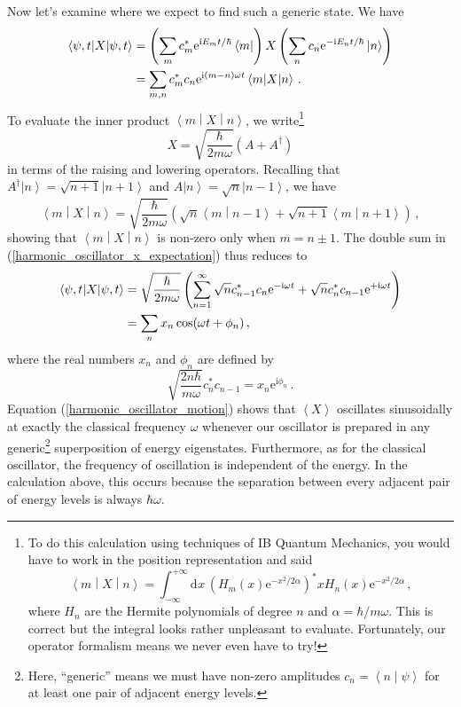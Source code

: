 \documentclass{article}
\theoremstyle{plain}\theoremheaderfont{\normalfont\itshape}\theorembodyfont{\rmfamily}\theoremseparator{.}\newtheorem*{rem}{Remark}\newtheorem*{ex}{Example}\newtheorem*{proof}{Proof}\newtheorem*{altp}{Alternative proof}
\theoremstyle{plain}\theoremheaderfont{\normalfont\bfseries}\theorembodyfont{\rmfamily}\theoremseparator{.}\newtheorem{thm}{Theorem}[section]\newtheorem{lem}[thm]{Lemma}\newtheorem{prop}[thm]{Proposition}\newtheorem*{cor}{Corollary}\newtheorem{defn}[thm]{Definition}\newtheorem{clm}[thm]{Claim}\newtheorem{clminproof}{Claim}
\theoremstyle{break}\theoremheaderfont{\normalfont\itshape}\theorembodyfont{\rmfamily}\theoremseparator{.\medskip}\newtheorem*{proofskip}{Proof}\newtheorem*{exs}{Examples}\newtheorem*{rems}{Remarks}
\theoremstyle{break}\theoremheaderfont{\normalfont\bfseries}\theorembodyfont{\rmfamily}\theoremseparator{.\medskip}\newtheorem{lemskip}[thm]{Lemma}\newtheorem{defnskip}[thm]{Definition}\newtheorem{propskip}[thm]{Proposition}\newtheorem{thmskip}[thm]{Theorem}
\numberwithin{equation}{section}
\newcommand{\ii}{\mathrm{i}}
\newcommand{\ee}{\mathrm{e}}
\newcommand{\dd}[2][]{\mathrm{d}^{#1} #2\,}
\newcommand{\bra}[1]{\left\langle #1 \right|}
\newcommand{\ket}[1]{\left| #1 \right\rangle}
\newcommand{\braket}[2]{\left\langle #1 \middle| #2 \right\rangle}
\newcommand{\mel}[3]{\left\langle #1 \middle| #2 \middle| #3 \right\rangle}
\newcommand{\eval}[1]{\left\langle #1 \right\rangle}
\newcommand{\expval}[2]{\left\langle #2 \middle| #1 \middle| #2 \right\rangle}
\begin{document}
    Now let's examine where we expect to find such a generic state. We have
    \begin{align}
        \expval{X}{\psi,t}&=\left(\sum_m c_m^* \ee^{\ii E_mt/\hbar}\bra{m}\right)X\left(\sum_n c_n \ee^{-\ii E_nt/\hbar}\ket{n}\right) \notag\\
        &=\sum_{m,n}c_m^* c_n \ee^{\ii (m-n)\omega t}\mel{m}{X}{n}\,.\label{harmonic_oscillator_x_expectation}
    \end{align}
    To evaluate the inner product \(\mel{m}{X}{n}\), we write\footnote{To do this calculation using techniques of IB Quantum Mechanics, you would have to work in the position representation and said
    \begin{equation}
        \mel{m}{X}{n}=\int_{-\infty}^{+\infty}\dd{x}\left(H_m(x)\ee^{-x^2/2\alpha}\right)^*xH_n(x)\ee^{-x^2/2\alpha}\,,
    \end{equation}
    where \(H_n\) are the Hermite polynomials of degree \(n\) and \(\alpha=\hbar/m\omega\). This is correct but the integral looks rather unpleasant to evaluate. Fortunately, our operator formalism means we never even have to try!}
    \begin{equation}
        X=\sqrt{\frac{\hbar}{2m\omega}}\left(A+A^\dagger\right)
    \end{equation}
    in terms of the raising and lowering operators. Recalling that \(A^\dagger\ket{n}=\sqrt{n+1}\ket{n+1}\) and \(A\ket{n}=\sqrt{n}\ket{n-1}\), we have
    \begin{equation}
        \mel{m}{X}{n}=\sqrt{\frac{\hbar}{2m\omega}}(\sqrt{n}\braket{m}{n-1}+\sqrt{n+1}\braket{m}{n+1})\,,
    \end{equation}
    showing that \(\mel{m}{X}{n}\) is non-zero only when \(m=n\pm 1\). The double sum in (\ref{harmonic_oscillator_x_expectation}) thus reduces to
    \begin{align}
        \expval{X}{\psi,t}&=\sqrt{\frac{\hbar}{2m\omega}}\left(\sum_{n=1}^{\infty}\sqrt{n}c_{n-1}^*c_n\ee^{-\ii \omega t}+\sqrt{n}c_n^*c_{n-1}\ee^{+\ii \omega t}\right)\notag\\
        &=\sum_n x_n\cos(\omega t+\phi_n)\,,\label{harmonic_oscillator_motion}
    \end{align}
    where the real numbers \(x_n\) and \(\phi_n\) are defined by
    \begin{equation}
        \sqrt{\frac{2n\hbar}{m\omega}}c_n^*c_{n-1}=x_n\ee^{\ii \phi_n}\,.
    \end{equation}
    Equation (\ref{harmonic_oscillator_motion}) shows that \(\eval{X}\) oscillates sinusoidally at exactly the classical frequency \(\omega\) whenever our oscillator is prepared in any generic\footnote{Here, ``generic'' means we must have non-zero amplitudes \(c_n=\braket{n}{\psi}\) for at least one pair of adjacent energy levels.} superposition of energy eigenstates. Furthermore, as for the classical oscillator, the frequency of oscillation is independent of the energy. In the calculation above, this occurs because the separation between every adjacent pair of energy levels is always \(\hbar\omega\).
\end{document}
